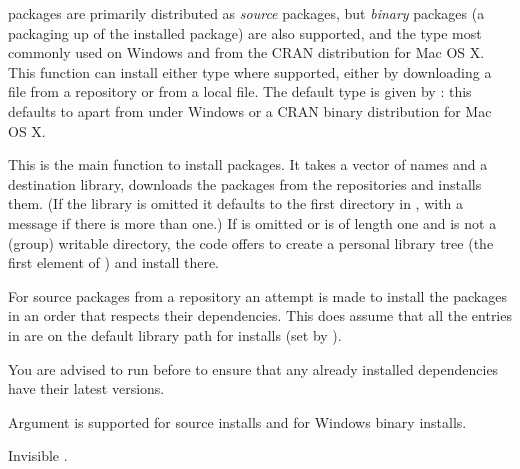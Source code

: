 \begin{Details}\relax
\R{} packages are primarily distributed as \emph{source} packages, but
\emph{binary} packages (a packaging up of the installed package) are
also supported, and the type most commonly used on Windows and from
the CRAN distribution for Mac OS X.  This function can install either
type where supported, either by downloading a file from a repository
or from a local file.  The default type is given by
: this defaults to 
apart from under Windows or a CRAN binary distribution for Mac OS X.

This is the main function to install packages. It takes
a vector of names and a destination library, downloads the packages
from the repositories and installs them.  (If the library is omitted
it defaults to the first directory in , with a
message if there is more than one.)  If  is omitted or is of
length one and is not a (group) writable directory, the code offers
to create a personal library tree (the first element of
) and install there.

For source packages from a repository an attempt is made to
install the packages in an order that respects their dependencies.
This does assume that all the entries in  are on the default
library path for installs (set by ).

You are advised to run  before
 to ensure that any already installed
dependencies have their latest versions.

Argument  is supported for source installs and for
Windows binary installs.
\end{Details}
%
\begin{Value}
Invisible .
\end{Value}
%
